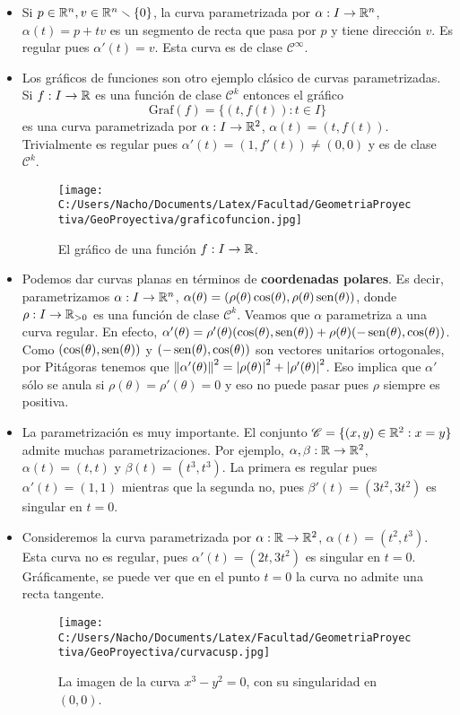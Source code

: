 \begin{ex}\hfill

\begin{itemize}\item Si $p\in\mathbb{R}^n, v\in\mathbb{R}^n\smallsetminus\{0\}$, la curva parametrizada por $\alpha:I\to\mathbb{R}^n$, $\alpha(t)=p+tv$ es un segmento de recta que pasa por $p$ y tiene dirección $v$. Es regular pues $\alpha'(t) = v$. Esta curva es de clase $\mathscr{C}^\infty$.
\item Los gráficos de funciones son otro ejemplo clásico de curvas parametrizadas. Si $f:I\to\mathbb{R}$ es una función de clase $\mathscr{C}^k$ entonces el gráfico $$\mathrm{Graf}(f) = \{(t,f(t)) : t\in I\}$$ es una curva parametrizada por $\alpha:I\to\mathbb{R}^2$, $\alpha(t)=(t,f(t))$. Trivialmente es regular pues $\alpha'(t)=(1,f'(t))\neq (0,0)$ y es de clase $\mathscr{C}^k$.
\begin{figure}[h]
	\centering
		\texttt{[image: C:/Users/Nacho/Documents/Latex/Facultad/GeometriaProyectiva/GeoProyectiva/graficofuncion.jpg]}
	\caption{El gráfico de una función $f:I\to\mathbb{R}$.}
	\label{fig:graficofuncion}
\end{figure}
\item Podemos dar curvas planas en términos de \textbf{coordenadas polares}. Es decir, parametrizamos $\alpha:I\to\mathbb{R}^n$, $\alpha(\theta)=(\rho(\theta)\cos(\theta),\rho(\theta)\operatorname{sen}(\theta))$, donde $\rho:I\to\mathbb{R}_{>0}$ es una función de clase $\mathscr{C}^k$. Veamos que $\alpha$ parametriza a una curva regular. En efecto, $\alpha'(\theta) = \rho'(\theta)(\cos(\theta),\operatorname{sen}(\theta)) + \rho(\theta)(-\operatorname{sen}(\theta),\cos(\theta))$. Como $(\cos(\theta),\operatorname{sen}(\theta))$ y $(-\operatorname{sen}(\theta),\cos(\theta))$ son vectores unitarios ortogonales, por Pitágoras tenemos que $\left\| \alpha'(\theta) \right\|^2 = \left\lvert \rho(\theta) \right\rvert^2 + \left\lvert \rho'(\theta) \right\rvert^2$. Eso implica que $\alpha'$ sólo se anula si $\rho(\theta)=\rho'(\theta)=0$ y eso no puede pasar pues $\rho$ siempre es positiva.
\item La parametrización es muy importante. El conjunto $\mathscr{C}=\{(x,y)\in\mathbb{R}^2:x=y\}$ admite muchas parametrizaciones. Por ejemplo, $\alpha,\beta:\mathbb{R}\to\mathbb{R}^2$, $\alpha(t)=(t,t)$ y $\beta(t)=(t^3,t^3)$. La primera es regular pues $\alpha'(t)=(1,1)$ mientras que la segunda no, pues $\beta'(t)=(3t^2,3t^2)$ es singular en $t=0$.
\item Consideremos la curva parametrizada por $\alpha:\mathbb{R}\to\mathbb{R}^2$, $\alpha(t)=(t^2,t^3)$. Esta curva no es regular, pues $\alpha'(t)=(2t,3t^2)$ es singular en $t=0$. Gráficamente, se puede ver que en el punto $t=0$ la curva no admite una recta tangente.
\begin{figure}[h]
	\centering
		\texttt{[image: C:/Users/Nacho/Documents/Latex/Facultad/GeometriaProyectiva/GeoProyectiva/curvacusp.jpg]}
	\caption{La imagen de la curva $x^3 - y^2 = 0$, con su singularidad en $(0,0)$.}
	\label{fig:curvacusp}
\end{figure}
\end{itemize}
\end{ex}

